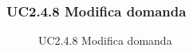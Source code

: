 \subsubsection{UC2.4.8 Modifica domanda}
\begin{figure}[H]
\centering
\noindent{}
\caption{UC2.4.8 Modifica domanda}
\end{figure}
